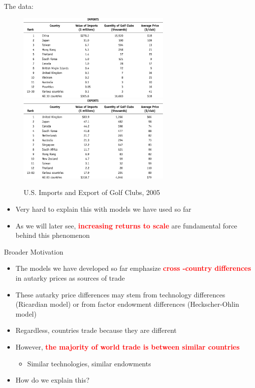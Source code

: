 \documentclass[10pt,hyperref={CJKbookmarks=true},xcolor=dvipsnames,aspectratio=169]{beamer}
\begin{document}
\begin{frame}{The data:}


\begin{figure}
\protect\caption{U.S. Imports and Export of Golf Clubs, 2005}


\centering{}\includegraphics[width=7.5cm]{fig/krugman/lec6-1}\includegraphics[width=7.5cm]{fig/krugman/lec6-2}
\end{figure}

\begin{itemize}
\item Very hard to explain this with models we have used so far 
\item As we will later see, \textbf{\textcolor{red}{increasing returns to
scale}} are fundamental force behind this phenomenon
\end{itemize}
\end{frame}

\begin{frame}{Broader Motivation}

\begin{itemize}
\item The models we have developed so far emphasize \textbf{\textcolor{red}{cross
-country differences}} in autarky prices as sources of trade 
\item These autarky price differences may stem from technology differences
(Ricardian model) or from factor endowment differences (Heckscher-Ohlin
model) 
\item Regardless, countries trade because they are different 
\item However, \textbf{\textcolor{red}{the majority of world trade is between
similar countries}} 

\begin{itemize}
\item Similar technologies, similar endowments 
\end{itemize}
\item How do we explain this? 
\end{itemize}
\end{frame}
\end{document}
